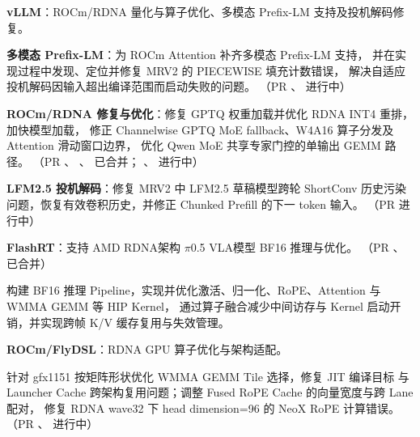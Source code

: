 \documentclass{resume}
\let\ResumeOriginalItemize\itemize
\let\ResumeOriginalEndItemize\enditemize
\renewenvironment{itemize}{%
  \ResumeOriginalItemize
  \addtolength{\topsep}{0.2em}%
  \addtolength{\itemsep}{0.2em}%
}{%
  \ResumeOriginalEndItemize
}
\begin{document}
\begin{itemize}

  \item \textbf{vLLM}：ROCm/RDNA 量化与算子优化、多模态 Prefix-LM 支持及投机解码修复。
  \begin{itemize}
    \item \textbf{多模态 Prefix-LM}：为 ROCm Attention 补齐多模态 Prefix-LM 支持，
    并在实现过程中发现、定位并修复 MRV2 的 PIECEWISE 填充计数错误，
    解决自适应投机解码因输入超出编译范围而启动失败的问题。
    （PR 、
     进行中）

    \item \textbf{ROCm/RDNA 修复与优化}：修复 GPTQ 权重加载并优化 RDNA INT4 重排，加快模型加载，
    修正 Channelwise GPTQ MoE fallback、W4A16 算子分发及 Attention 滑动窗口边界，
    优化 Qwen MoE 共享专家门控的单输出 GEMM 路径。
    （PR 、
     、
     已合并；
    、
     进行中）

    \item \textbf{LFM2.5 投机解码}：修复 MRV2 中 LFM2.5 草稿模型跨轮 ShortConv
    历史污染问题，恢复有效卷积历史，并修正 Chunked Prefill 的下一 token 输入。
    （PR  进行中）
  \end{itemize}

  \item \textbf{FlashRT}：支持 AMD RDNA架构 $\pi$0.5 VLA模型 BF16 推理与优化。
  （PR 、
   已合并）
  \begin{itemize}
    \item 构建 BF16 推理 Pipeline，实现并优化激活、归一化、RoPE、Attention 与 WMMA GEMM 等 HIP Kernel，
    通过算子融合减少中间访存与 Kernel 启动开销，并实现跨帧 K/V 缓存复用与失效管理。
  \end{itemize}

  \item \textbf{ROCm/FlyDSL}：RDNA GPU 算子优化与架构适配。
  \begin{itemize}
    \item 针对 gfx1151 按矩阵形状优化 WMMA GEMM Tile 选择，修复 JIT 编译目标
    与 Launcher Cache 跨架构复用问题；调整 Fused RoPE Cache 的向量宽度与跨 Lane 配对，
    修复 RDNA wave32 下 head dimension=96 的 NeoX RoPE 计算错误。
    （PR 、
     进行中）
  \end{itemize}
\end{itemize}
\end{document}
